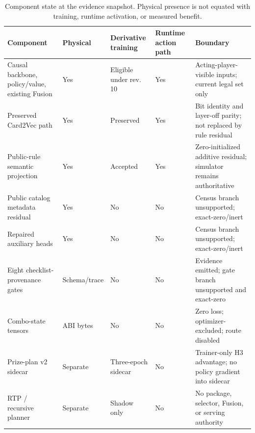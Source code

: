 \begin{table}[t]
\centering
\footnotesize
\caption{Component state at the evidence snapshot. Physical presence is not
equated with training, runtime activation, or measured benefit.}
\label{tab:components}
\begin{tabularx}{0.98\textwidth}{p{}p{}p{}p{}Y}
\toprule
Component & Physical & Derivative training & Runtime action path & Boundary \\
\midrule
Causal backbone, policy/value, existing Fusion & Yes & Eligible under rev. 10 & Yes & Acting-player-visible inputs; current legal set only \\
Preserved Card2Vec path & Yes & Preserved & Yes & Bit identity and layer-off parity; not replaced by rule residual \\
Public-rule semantic projection & Yes & Accepted & Yes & Zero-initialized additive residual; simulator remains authoritative \\
Public catalog metadata residual & Yes & No & No & Census branch unsupported; exact-zero/inert \\
Repaired auxiliary heads & Yes & No & No & Census branch unsupported; exact-zero/inert \\
Eight checklist-provenance gates & Schema/trace & No & No & Evidence emitted; gate branch unsupported and exact-zero \\
Combo-state tensors & ABI bytes & No & No & Zero loss; optimizer-excluded; route disabled \\
Prize-plan v2 sidecar & Separate & Three-epoch sidecar & No & Trainer-only H3 advantage; no policy gradient into sidecar \\
RTP / recursive planner & Separate & Shadow only & No & No package, selector, Fusion, or serving authority \\
\bottomrule
\end{tabularx}
\end{table}
